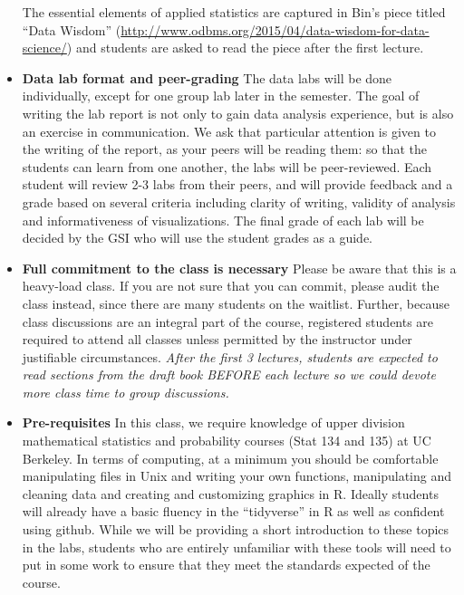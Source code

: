 \documentclass[11pt]{article}
\begin{document}
\begin{itemize}
The essential elements of applied statistics are captured in Bin's piece titled ``Data Wisdom'' (\url{http://www.odbms.org/2015/04/data-wisdom-for-data-science/}) and students are asked to read the piece after the first lecture.

\item {\bf Data lab format and peer-grading}
The data labs will be done individually, except for one group lab later in the semester. 
The goal of writing the lab report is not only to gain data analysis experience, but is also 
an exercise in communication. We ask that particular attention
is given to the writing of the report, as your peers will be reading them:
so that the students can learn from one another, the labs will be peer-reviewed. 
Each student will review 2-3 labs from their peers, and will provide feedback and a grade based on several criteria
including clarity of writing, validity of analysis and informativeness of visualizations. 
The final grade of each lab will be decided by the GSI who will use the student grades as a guide.


\item {\bf Full commitment to the class is necessary}
Please be aware that this is a heavy-load class. If you are not sure that you can commit, 
please audit the class instead, since there are many students on the waitlist. 
Further, because class discussions are an integral part of the course,
registered students are required to attend all classes unless permitted
by the instructor under justifiable circumstances. {\em After the first
3 lectures, students are expected to read sections from the draft book 
BEFORE each lecture so we could devote more class time to group
discussions.} 

\item {\bf Pre-requisites}
In this class, we require knowledge of upper division mathematical
statistics and probability courses (Stat 134 and 135) at UC Berkeley.  
In terms of computing, at a minimum you should be comfortable manipulating files in Unix and
writing your own functions, manipulating and cleaning data and
creating and customizing graphics in R. Ideally students will already have a basic fluency in the 
``tidyverse'' in R as well as confident using github. While we will be providing a short introduction to
these topics in the labs, students who are entirely unfamiliar with these tools will need to put in 
some work to ensure that they meet the standards expected of the course.\\

\end{itemize}
\end{document}
